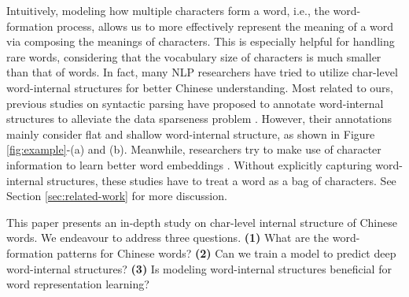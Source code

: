 Intuitively, modeling how multiple characters form a word, i.e., the word-formation process, allows us to  more effectively represent the meaning of a word via composing the meanings of characters. 
This is especially helpful for handling rare words,  considering that the vocabulary size of characters is much  smaller than that of words.
In fact, many NLP researchers have tried to utilize char-level word-internal structures for better Chinese understanding. 
Most related to ours, previous studies on syntactic parsing have proposed to annotate word-internal structures to alleviate the data sparseness problem \cite{zhang-etal-2014-char,li-etal-aaai-2018-zhaohai}. However, their annotations mainly consider flat and shallow word-internal structure, as shown in Figure \ref{fig:example}-(a) and (b). 
Meanwhile, researchers try to make use of character information to learn better word embeddings \cite{chen-ijcai2015-joint-char-word-emb,xu-naacl-2016-internal-structure}. 
Without explicitly capturing word-internal structures, these studies have to treat a word as a bag of characters.
See Section \ref{sec:related-work} for more discussion. 

This paper presents an in-depth study on char-level internal structure of Chinese  words. We endeavour to address three questions. \textbf{\footnotesize{(1)}} What are 
the word-formation patterns for Chinese words? \textbf{\footnotesize{(2)}} Can we train a model to predict deep word-internal structures? 
\textbf{\footnotesize{(3)}} Is modeling word-internal structures beneficial for word representation learning? 

